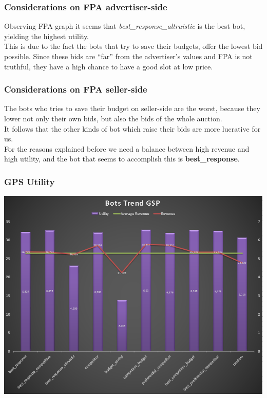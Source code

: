 \documentclass{beamer}
\begin{document}
\begin{frame}
\frametitle{Considerations on FPA advertiser-side }
Observing FPA graph it seems that \textit{best\_response\_altruistic} is the best bot, yielding the \alert{highest} utility.\\
\medskip
This is due to the fact the bots that try to save their budgets, offer the lowest bid possible.
Since these bids are ``far'' from the advertiser's values and FPA is not truthful, they have a high chance to have a good slot at low price. 
\end{frame}

\begin{frame}
\frametitle{Considerations on FPA seller-side }
The bots who tries to save their budget on seller-side are the \alert{worst}, because they lower not only their own bids, but also the bids of the whole auction.\\
\medskip
It follows that the other kinds of bot which raise their bids are more \alert{lucrative} for us.\\
\medskip
For the reasons explained before we need a balance between high revenue and high utility, and the bot that seems to accomplish this is \textbf{best\_response}.
\end{frame}

\begin{frame}
\frametitle{GPS Utility}
\begin{center}
\includegraphics[scale=0.46]{img/Auctions/GSP_all_Utility.PNG} 
\end{center}
\end{frame}
\end{document}
